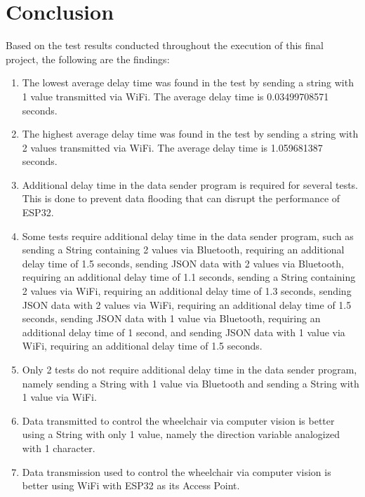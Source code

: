 \section{Conclusion}
\label{sec:kesimpulan}

Based on the test results conducted throughout the execution of this final project, the following are the findings:

\begin{enumerate}

  \item The lowest average delay time was found in the test by sending a string with 1 value transmitted via WiFi. The average delay time is 0.03499708571 seconds.

  \item The highest average delay time was found in the test by sending a string with 2 values transmitted via WiFi. The average delay time is 1.059681387 seconds.
  
  \item Additional delay time in the data sender program is required for several tests. This is done to prevent data flooding that can disrupt the performance of ESP32.

  \item Some tests require additional delay time in the data sender program, such as sending a String containing 2 values via Bluetooth, requiring an additional delay time of 1.5 seconds, sending JSON data with 2 values via Bluetooth, requiring an additional delay time of 1.1 seconds, sending a String containing 2 values via WiFi, requiring an additional delay time of 1.3 seconds, sending JSON data with 2 values via WiFi, requiring an additional delay time of 1.5 seconds, sending JSON data with 1 value via Bluetooth, requiring an additional delay time of 1 second, and sending JSON data with 1 value via WiFi, requiring an additional delay time of 1.5 seconds.
  
  \item Only 2 tests do not require additional delay time in the data sender program, namely sending a String with 1 value via Bluetooth and sending a String with 1 value via WiFi. 
  
  \item Data transmitted to control the wheelchair via computer vision is better using a String with only 1 value, namely the direction variable analogized with 1 character. 
  
  \item Data transmission used to control the wheelchair via computer vision is better using WiFi with ESP32 as its Access Point.

\end{enumerate}

